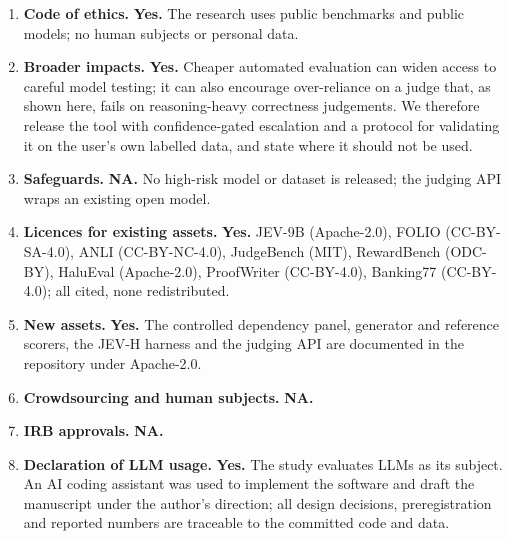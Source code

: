 \begin{enumerate}[leftmargin=1.4em,itemsep=3pt]
\item \textbf{Code of ethics.} \textbf{Yes.} The research uses public benchmarks and public models; no human subjects or personal data.

\item \textbf{Broader impacts.} \textbf{Yes.} Cheaper automated evaluation can widen access to careful model testing; it can also encourage over-reliance on a judge that, as shown here, fails on reasoning-heavy correctness judgements. We therefore release the tool with confidence-gated escalation and a protocol for validating it on the user's own labelled data, and state where it should not be used.

\item \textbf{Safeguards.} \textbf{NA.} No high-risk model or dataset is released; the judging API wraps an existing open model.

\item \textbf{Licences for existing assets.} \textbf{Yes.} JEV-9B (Apache-2.0), FOLIO (CC-BY-SA-4.0), ANLI (CC-BY-NC-4.0), JudgeBench (MIT), RewardBench (ODC-BY), HaluEval (Apache-2.0), ProofWriter (CC-BY-4.0), Banking77 (CC-BY-4.0); all cited, none redistributed.

\item \textbf{New assets.} \textbf{Yes.} The controlled dependency panel, generator and reference scorers, the JEV-H harness and the judging API are documented in the repository under Apache-2.0.

\item \textbf{Crowdsourcing and human subjects.} \textbf{NA.}

\item \textbf{IRB approvals.} \textbf{NA.}

\item \textbf{Declaration of LLM usage.} \textbf{Yes.} The study evaluates LLMs as its subject. An AI coding assistant was used to implement the software and draft the manuscript under the author's direction; all design decisions, preregistration and reported numbers are traceable to the committed code and data.
\end{enumerate}
